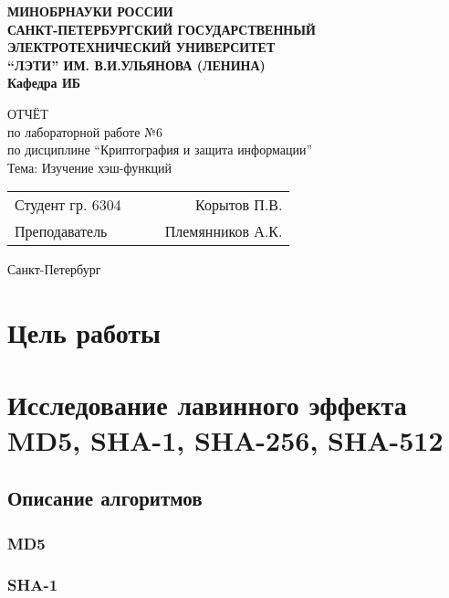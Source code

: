 \documentclass[a4paper, 14pt]{extarticle}
\begin{document}
\begin{titlepage}
    \centering
    {\bfseries
        \uppercase{
            Минобрнауки России \\
            Санкт-Петербургский государственный \\
            Электротехнический университет \\
            \enquote{ЛЭТИ} им. В.И.Ульянова (Ленина)\\
        }
        Кафедра ИБ

        \vspace{\fill}
        \uppercase{Отчёт} \\
        по лабораторной работе №6 \\
        по дисциплине \enquote{Криптография и защита информации} \\
        Тема: Изучение хэш-функций
    }

    \vspace{\fill}
    \begin{tabularx}{0.8\textwidth}{l X c r}
        Студент гр. 6304 & & \underline{\hspace{3cm}} & Корытов П.В.\\
        Преподаватель & & \underline{\hspace{3cm}} & Племянников А.К.
    \end{tabularx}

    \vspace{1cm}
    Санкт-Петербург \\
    \the\year{}
\end{titlepage}

\section*{Цель работы}
\lipsum[1] %

\section{Исследование лавинного эффекта MD5, SHA-1, SHA-256, SHA-512}
\subsection{Описание алгоритмов}
\subsubsection{MD5}
\lipsum[1] %

\subsubsection{SHA-1}
\lipsum[1] %
\end{document}
